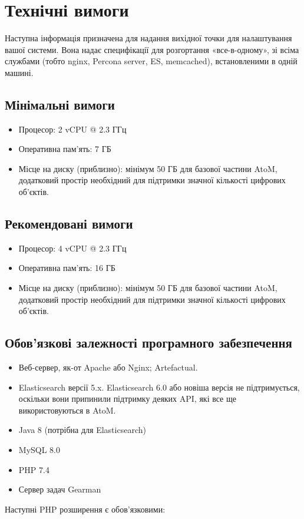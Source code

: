 \documentclass[14pt,a4paper]{article}
\begin{document}
\section{Технічні вимоги}
Наступна інформація призначена для надання вихідної точки для налаштування вашої системи. Вона надає специфікації для розгортання «все-в-одному», зі всіма службами (тобто nginx, Percona server, ES, memcached), встановленими в одній машині.
\begin{large}

\subsection{Мінімальні вимоги}
\begin{itemize}
    \item Процесор: 2 vCPU @ 2.3 ГГц
    \item Оперативна пам'ять: 7 ГБ
    \item Місце на диску (приблизно): мінімум 50 ГБ для базової частини AtoM, додатковий простір необхідний для підтримки значної кількості цифрових об'єктів.
\end{itemize}

\subsection{Рекомендовані вимоги}
\begin{itemize}
    \item Процесор: 4 vCPU @ 2.3 ГГц
    \item Оперативна пам'ять: 16 ГБ
    \item Місце на диску (приблизно): мінімум 50 ГБ для базової частини AtoM, додатковий простір необхідний для підтримки значної кількості цифрових об'єктів.
\end{itemize}

\subsection{Обов’язкові залежності програмного забезпечення }
\begin{itemize}
    \item Веб-сервер, як-от Apache або Nginx; Artefactual.
    \item Elasticsearch версії 5.x. Elasticsearch 6.0 або новіша версія не підтримується, оскільки вони припинили підтримку деяких API, які все ще використовуються в AtoM.
    \item Java 8 (потрібна для Elasticsearch)
    \item MySQL 8.0
    \item PHP 7.4
    \item Сервер задач Gearman
\end{itemize}
Наступні PHP розширення є обов'язковими:


\end{large}
\end{document}
